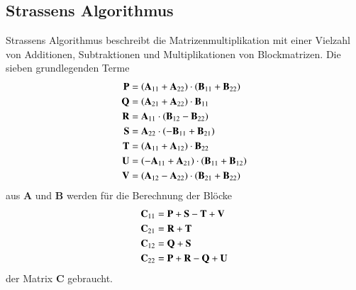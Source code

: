 \subsection{Strassens Algorithmus}
%
%
Strassens Algorithmus \cite{multiplikation:strassen_1969} beschreibt die Matrizenmultiplikation mit einer Vielzahl von Additionen, Subtraktionen und Multiplikationen von Blockmatrizen.
Die sieben grundlegenden Terme
\begin{equation} \label{multiplikation:eq:strassen}
\begin{split}
\text{\textbf{P}}   &= \left(\mathbf{A}_{11} + \mathbf{A}_{22}\right ) \cdot \left(\mathbf{B}_{11} + \mathbf{B}_{22}\right ) \\
\text{\textbf{Q}}  &= \left(\mathbf{A}_{21} + \mathbf{A}_{22}\right ) \cdot \mathbf{B}_{11} \\
\text{\textbf{R}} &= \mathbf{A}_{11} \cdot \left(\mathbf{B}_{12}-\mathbf{B}_{22}\right ) \\
\text{\textbf{S}}  &= \mathbf{A}_{22} \cdot \left(-\mathbf{B}_{11}+\mathbf{B}_{21}\right ) \\
\text{\textbf{T}}   &= \left(\mathbf{A}_{11} + \mathbf{A}_{12}\right ) \cdot \mathbf{B}_{22} \\
\text{\textbf{U}}  &= \left(-\mathbf{A}_{11} + \mathbf{A}_{21}\right ) \cdot \left(\mathbf{B}_{11} + \mathbf{B}_{12}\right ) \\
\text{\textbf{V}} &= \left(\mathbf{A}_{12} - \mathbf{A}_{22}\right ) \cdot \left(\mathbf{B}_{21} + \mathbf{B}_{22}\right )
\end{split}
\end{equation}
aus $\mathbf{A}$ und $\mathbf{B}$ werden f\"ur die Berechnung der Bl\"ocke
\begin{equation} \label{multiplikation:eq:strassen2}
\begin{split}
\mathbf{C}_{11} &= \text{\textbf{P}} + \text{\textbf{S}} - \text{\textbf{T}} + \text{\textbf{V}} \\
\mathbf{C}_{21} &= \text{\textbf{R}} + \text{\textbf{T}} \\
\mathbf{C}_{12} &= \text{\textbf{Q}} + \text{\textbf{S}}\\
\mathbf{C}_{22} &= \text{\textbf{P}} + \text{\textbf{R}} - \text{\textbf{Q}} + \text{\textbf{U}}
\end{split}
\end{equation}
der Matrix $\mathbf{C}$ gebraucht.
